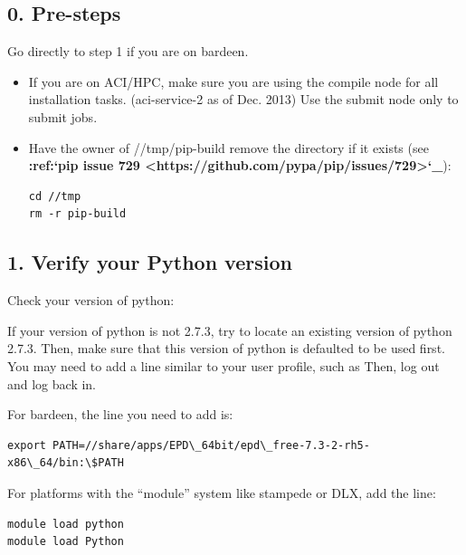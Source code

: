 \documentclass[letterpaper,10pt,english]{sphinxmanual}
\begin{document}
\subsection{0. Pre-steps}
\label{1_0_installation:pre-steps}
Go directly to step 1 if you are on bardeen.
\begin{itemize}
\item {} 
If you are on ACI/HPC, make sure you are using the compile node for all installation tasks. (aci-service-2 as of Dec. 2013) Use the submit node only to submit jobs.

\item {} 
Have the owner of //tmp/pip-build remove the directory if it exists (see {\color{red}\bfseries{}:ref:{}`pip issue 729 \textless{}https://github.com/pypa/pip/issues/729\textgreater{}{}`\_}):

\begin{Verbatim}[commandchars=\\\{\}]
cd //tmp
rm -r pip-build
\end{Verbatim}

\end{itemize}


\subsection{1. Verify your Python version}
\label{1_0_installation:verify-your-python-version}
Check your version of python: 

If your version of python is not 2.7.3, try to locate an existing version of python 2.7.3.
Then, make sure that this version of python is defaulted to be used first. You may need to add a line similar to your user profile, such as 
Then, log out and log back in.

For bardeen, the line you need to add is:

\begin{Verbatim}[commandchars=\\\{\}]
export PATH=//share/apps/EPD\_64bit/epd\_free-7.3-2-rh5-x86\_64/bin:\$PATH
\end{Verbatim}

For platforms with the ``module'' system like stampede or DLX, add the line:

\begin{Verbatim}[commandchars=\\\{\}]
module load python
module load Python
\end{Verbatim}
\end{document}
